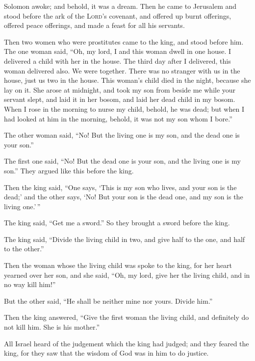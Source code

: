  Solomon awoke; and behold, it was a dream. Then he came
to Jerusalem and stood before the ark of the \textsc{Lord}'s covenant,
and offered up burnt offerings, offered peace offerings, and made a
feast for all his servants.

 Then two women who were prostitutes came to the king,
and stood before him.  The one woman said, ``Oh, my lord,
I and this woman dwell in one house. I delivered a child with her in the
house.  The third day after I delivered, this woman
delivered also. We were together. There was no stranger with us in the
house, just us two in the house.  This woman's child died
in the night, because she lay on it.  She arose at
midnight, and took my son from beside me while your servant slept, and
laid it in her bosom, and laid her dead child in my bosom.
 When I rose in the morning to nurse my child, behold, he
was dead; but when I had looked at him in the morning, behold, it was
not my son whom I bore.''

 The other woman said, ``No! But the living one is my
son, and the dead one is your son.''

The first one said, ``No! But the dead one is your son, and the living
one is my son.'' They argued like this before the king.

 Then the king said, ``One says, `This is my son who
lives, and your son is the dead;' and the other says, `No! But your son
is the dead one, and my son is the living one.'\,''

 The king said, ``Get me a sword.'' So they brought a
sword before the king.

 The king said, ``Divide the living child in two, and
give half to the one, and half to the other.''

 Then the woman whose the living child was spoke to the
king, for her heart yearned over her son, and she said, ``Oh, my lord,
give her the living child, and in no way kill him!''

But the other said, ``He shall be neither mine nor yours. Divide him.''

 Then the king answered, ``Give the first woman the
living child, and definitely do not kill him. She is his mother.''

 All Israel heard of the judgement which the king had
judged; and they feared the king, for they saw that the wisdom of God
was in him to do justice.

